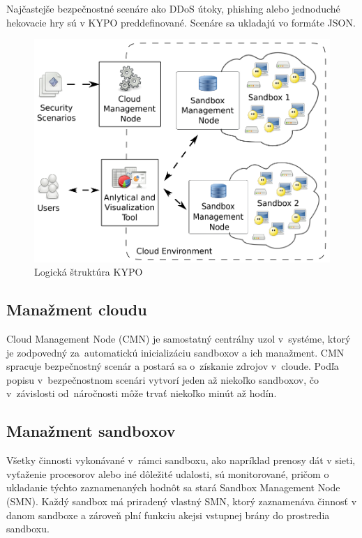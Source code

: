 \documentclass[
  printed, %
  twoside, %
  notable,   %
  nolof,   %
  nolot,   %
]{fithesis3}
\begin{document}
Najčastejše bezpečnostné scenáre ako DDoS útoky, phishing alebo jednoduché hekovacie hry sú v KYPO preddefinované. Scenáre sa ukladajú vo formáte JSON\cite{eichler2015kypo}.

\begin{figure}
	\center
	\includegraphics[width=0.875\linewidth]{kypo_logic_structure}
	\caption{Logická štruktúra KYPO\cite{eichler2015kypo}}
	\label{kypo_logic_structure}
\end{figure}

\subsection{Manažment cloudu}
Cloud Management Node (CMN) je samostatný centrálny uzol v~systéme, ktorý je zodpovedný za~automatickú inicializáciu sandboxov a ich manažment. CMN spracuje bezpečnostný scenár a postará sa o~získanie zdrojov v~cloude. Podľa popisu v~bezpečnostnom scenári vytvorí jeden až niekoľko sandboxov, čo v~závislosti od~náročnosti môže trvať niekoľko minút až hodín\cite{eichler2015kypo}.

\subsection{Manažment sandboxov}
\label{smn}
Všetky činnosti vykonávané v~rámci sandboxu, ako napríklad prenosy dát v sieti, vyťaženie procesorov alebo iné dôležité udalosti, sú monitorované, pričom o ukladanie týchto zaznamenaných hodnôt sa stará Sandbox Management Node (SMN). Každý sandbox má priradený vlastný SMN, ktorý zaznamenáva činnosť v danom sandboxe a zároveň plní funkciu akejsi vstupnej brány do prostredia sandboxu\cite{eichler2014analytical}.
\end{document}

